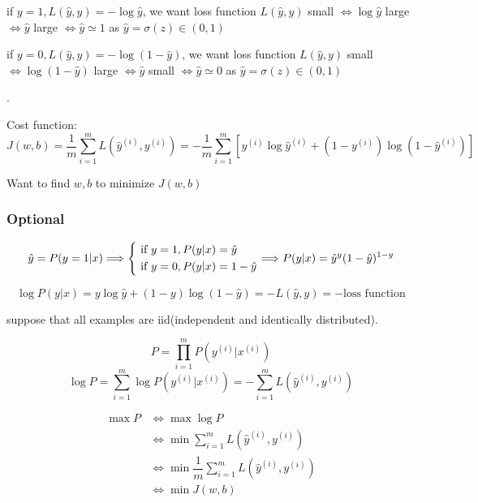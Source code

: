 if $y = 1, L(\hat{y}, y) = - \log \hat{y}$,
we want loss function $L(\hat{y}, y)$ small $\Leftrightarrow \log \hat{y}$ large $\Leftrightarrow \hat{y}$ large $\Leftrightarrow \hat{y} \simeq 1$ as $\hat{y} = \sigma(z) \in (0, 1)$

if $y = 0, L(\hat{y}, y) = - \log (1 - \hat{y})$,
we want loss function $L(\hat{y}, y)$ small $\Leftrightarrow \log (1 - \hat{y})$ large $\Leftrightarrow \hat{y}$ small $\Leftrightarrow \hat{y} \simeq 0$ as $\hat{y} = \sigma(z) \in (0, 1)$


.

Cost function:
$$
J(w, b)
=   \dfrac{1}{m} \sum_{i = 1}^m L(\hat{y}^{(i)}, y^{(i)})
= - \dfrac{1}{m} \sum_{i = 1}^m [y^{(i)} \log \hat{y}^{(i)} + (1 - y^{(i)}) \log (1 - \hat{y}^{(i)})]
$$

Want to find $w, b$ to minimize $J(w, b)$

\subsubsection{Optional}
$$
\hat{y} = P(y = 1 | x)
\Longrightarrow
\left\{
	\begin{aligned}
		& \textrm{\ if } y = 1, P(y|x) = \hat{y} \\
		& \textrm{\ if } y = 0, P(y|x) = 1 - \hat{y}
	\end{aligned}
\right.
\Longrightarrow
P(y|x) = \hat{y}^y (1 - \hat{y})^{1 - y}
$$

$$ \log P(y|x) = y \log \hat{y} + (1 - y) \log (1 - \hat{y}) = - L(\hat{y}, y) = - \text{loss function} $$

suppose that all examples are iid(independent and identically distributed).

$$P = \prod_{i = 1}^m P(y^{(i)} | x^{(i)})$$
$$\log P = \sum_{i = 1}^m \log P(y^{(i)} | x^{(i)}) = - \sum_{i = 1}^m L(\hat{y}^{(i)}, y^{(i)})$$

$$
\begin{aligned}
\max P & \Longleftrightarrow \max \log P \\
	   & \Longleftrightarrow \min \sum_{i = 1}^m L(\hat{y}^{(i)}, y^{(i)}) \\
	   & \Longleftrightarrow \min \dfrac{1}{m} \sum_{i = 1}^m L(\hat{y}^{(i)}, y^{(i)}) \\
	   & \Longleftrightarrow \min J(w, b)
\end{aligned}
$$

